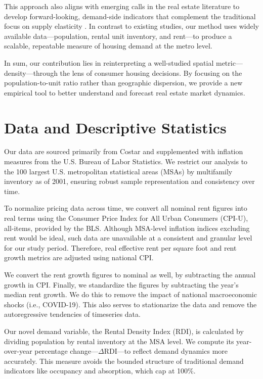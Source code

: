 \documentclass[APA,Times1COL]{WileyNJDv5} %
\begin{document}
This approach also aligns with emerging calls in the real estate literature to develop forward-looking, demand-side indicators that complement the traditional focus on supply elasticity \cite{glaeser2019rethinking}. In contrast to existing studies, our method uses widely available data---population, rental unit inventory, and rent---to produce a scalable, repeatable measure of housing demand at the metro level.

In sum, our contribution lies in reinterpreting a well-studied spatial metric---density---through the lens of consumer housing decisions. By focusing on the population-to-unit ratio rather than geographic dispersion, we provide a new empirical tool to better understand and forecast real estate market dynamics.

\section{Data and Descriptive Statistics}\label{sec3}
Our data are sourced primarily from Costar and supplemented with inflation measures from the U.S. Bureau of Labor Statistics. We restrict our analysis to the 100 largest U.S. metropolitan statistical areas (MSAs) by multifamily inventory as of 2001, ensuring robust sample representation and consistency over time.

To normalize pricing data across time, we convert all nominal rent figures into real terms using the Consumer Price Index for All Urban Consumers (CPI-U), all-items, provided by the BLS. Although MSA-level inflation indices excluding rent would be ideal, such data are unavailable at a consistent and granular level for our study period. Therefore, real effective rent per square foot and rent growth metrics are adjusted using national CPI. 

We convert the rent growth figures to nominal as well, by subtracting the annual growth in CPI. Finally, we standardize the figures by subtracting the year's median rent growth. We do this to remove the impact of national macroeconomic shocks (i.e., COVID-19). This also serves to stationarize the data and remove the autoregressive tendencies of timeseries data.

Our novel demand variable, the Rental Density Index (RDI), is calculated by dividing population by rental inventory at the MSA level. We compute its year-over-year percentage change---\(\Delta\text{RDI}\)---to reflect demand dynamics more accurately. This measure avoids the bounded structure of traditional demand indicators like occupancy and absorption, which cap at 100\%.
\end{document}
